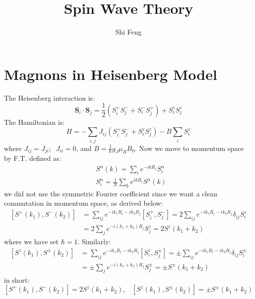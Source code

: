 \documentclass[11pt]{article}
\title{Spin Wave Theory}
\author{Shi Feng}
\date{}
\theoremstyle{remark}
\theoremstyle{definition}
\numberwithin{thm}{section}
\numberwithin{equation}{section}
\begin{document}
\maketitle
\section{Magnons in Heisenberg Model}
The Heisenberg interaction is:
\begin{equation}
	\textbf{S}_i\cdot\textbf{S}_j = \frac{1}{2}\left(S_i^+S_j^- + S_i^-S_j^+\right) + S_i^z S_j^z
\end{equation}
The Hamiltonian is:
\begin{equation}
	H = - \sum_{i,j}J_{ij}\left( S_i^+S_j^- + S_i^z S_j^z \right) - B \sum_{i}S_i^z  
\end{equation}
where $J_{ij} = J_{ji}; \;\; J_{ii} = 0$, and  $B = \frac{1}{\hbar}g_J\mu_B B_0$. Now we move to momentum space by F.T. defined as:
\begin{equation}
	\begin{split}
		&S^\alpha(k) = \sum_{i}e^{-i k R_i} S_i^\alpha\\
		&S_i^\alpha = \frac{1}{N} \sum_{k}e^{ikR_i}S^\alpha(k) 
	\end{split}
\end{equation}
we did not use the symmetric Fourier coefficient since we want a clean commutation in momentum space, as derived below:
\begin{equation}
\begin{split}
	[S^+(k_1), S^-(k_2)] &= \sum_{ij}e^{-ik_1 R_i - ik_2R_j}[S_i^+, S_j^-] = 2\sum_{ij}e^{-ik_1 R_i - ik_2 R_j}\delta_{ij}S_i^z\\
			     &=2\sum_{j} e^{-i(k_1+ k_2)R_j}S_j^z = 2 S^z(k_1 + k_2) 
\end{split}
\end{equation}
where we have set $\hbar = 1$. Similarly:
 \begin{equation}
	\begin{split}
		[S^z(k_1), S^\pm(k_2)] &= \sum_{ij}e^{-ik_1R_i - ik_2R_j}[S_i^z, S_j^\pm] = \pm \sum_{ij}e^{-ik_1R_i - ik_2R_j} \delta_{ij}S_i^\pm \\
				       &= \pm \sum_{j}e^{-i(k_1 + k_2)R_j}S_j^\pm = \pm S^\pm(k_1 + k_2) 
	\end{split}
\end{equation}
in short:
\begin{equation} \label{swt:3.6}
	\boxed{[S^+(k_1), S^-(k_2)] = 2S^z(k_1+ k_2),\;\;\;[S^z(k_1), S^\pm(k_2)] = \pm S^\pm(k_1 + k_2)}
\end{equation}
\end{document}
